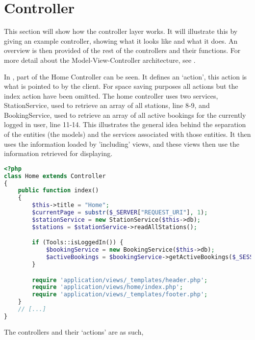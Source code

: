 \section{Controller}
This section will show how the controller layer works. 
It will illustrate this by giving an example controller, showing what it looks like and what it does.
An overview is then provided of the rest of the controllers and their functions.
For more detail about the Model-View-Controller architecture, see .

In , part of the Home Controller can be seen. 
It defines an `action', this action is what is pointed to by the client. 
For space saving purposes all actions but the index action have been omitted.
The home controller uses two services, StationService, used to retrieve an array of all stations, line 8-9, and BookingService, used to retrieve an array of all active bookings for the currently logged in user, line 11-14. 
This illustrates the general idea behind the separation of the entities (the models) and the services associated with those entities.
It then uses the information loaded by 'including' views, and these views then use the information retrieved for displaying.

\begin{lstlisting}[language=php, label=lst:homeController, caption={Home Controller Class}]
<?php
class Home extends Controller
{
    public function index()
    {
        $this->title = "Home";
        $currentPage = substr($_SERVER["REQUEST_URI"], 1);
        $stationService = new StationService($this->db);
        $stations = $stationService->readAllStations();

        if (Tools::isLoggedIn()) {
            $bookingService = new BookingService($this->db);
            $activeBookings = $bookingService->getActiveBookings($_SESSION["login_user"]);
        }

        require 'application/views/_templates/header.php';
        require 'application/views/home/index.php';
        require 'application/views/_templates/footer.php';
    }
    // [...]
}
\end{lstlisting}

The controllers and their `actions' are as such,

